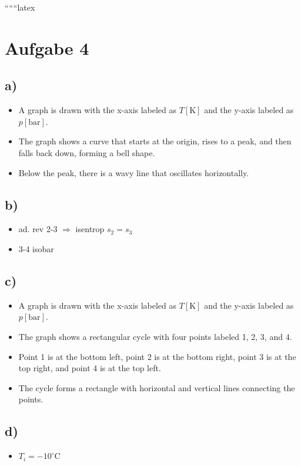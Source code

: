 
``````latex


\section*{Aufgabe 4}

\subsection*{a)}
\begin{itemize}
    \item A graph is drawn with the x-axis labeled as $T[\text{K}]$ and the y-axis labeled as $p[\text{bar}]$.
    \item The graph shows a curve that starts at the origin, rises to a peak, and then falls back down, forming a bell shape.
    \item Below the peak, there is a wavy line that oscillates horizontally.
\end{itemize}

\subsection*{b)}
\begin{itemize}
    \item ad. rev 2-3 $\Rightarrow$ isentrop $s_2 = s_3$
    \item 3-4 isobar
\end{itemize}

\subsection*{c)}
\begin{itemize}
    \item A graph is drawn with the x-axis labeled as $T[\text{K}]$ and the y-axis labeled as $p[\text{bar}]$.
    \item The graph shows a rectangular cycle with four points labeled 1, 2, 3, and 4.
    \item Point 1 is at the bottom left, point 2 is at the bottom right, point 3 is at the top right, and point 4 is at the top left.
    \item The cycle forms a rectangle with horizontal and vertical lines connecting the points.
\end{itemize}

\subsection*{d)}
\begin{itemize}
    \item $T_i = -10^\circ \text{C}$
\end{itemize}

